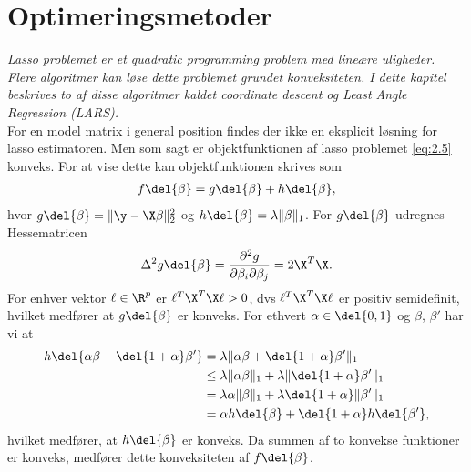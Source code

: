 \chapter{Optimeringsmetoder} \label{kap:optimeringsmetoder}
\textit{Lasso problemet er et quadratic programming problem med lineære uligheder. 
Flere algoritmer kan løse dette problemet grundet konveksiteten.  
I dette kapitel beskrives to af disse algoritmer kaldet coordinate descent og Least Angle Regression (LARS).} \\[4mm]
%
For en model matrix i general position findes der ikke en eksplicit løsning for lasso estimatoren.
Men som sagt er objektfunktionen af lasso problemet \eqref{eq:2.5} konveks.
For at vise dette kan objektfunktionen skrives som
\begin{align*}
f \del{\beta} = g \del{\beta} + h \del{\beta},
\end{align*}
hvor \(g \del{\beta} = \Vert \y - \X \beta \Vert_2^2\) og \(h \del{\beta} = \lambda \Vert \beta \Vert_1\).
For \(g \del{\beta}\) udregnes Hessematricen
\begin{align*}
\Delta^2 g \del{\beta} = \frac{\partial^2 g }{\partial \beta_i \partial \beta_j} = 2 \X^T \X.
\end{align*}
For enhver vektor \(\ell \in \R^p\) er \(\ell^T \X^T \X \ell > 0\), dvs \(\ell^T \X^T \X \ell \) er positiv semidefinit, hvilket medfører at \(g \del{\beta}\) er konveks.
For ethvert \(\alpha \in \del{0,1}\) og \(\beta\), \(\beta'\) har vi at
\begin{align*}
h \del{\alpha \beta + \del{1+\alpha}\beta'} &= \lambda \Vert \alpha \beta + \del{1+\alpha} \beta' \Vert_1 \\
&\leq \lambda \Vert \alpha \beta \Vert_1 + \lambda \Vert \del{1+\alpha} \beta' \Vert_1 \\
&= \lambda \alpha \Vert \beta \Vert_1 + \lambda \del{1+\alpha} \Vert \beta' \Vert_1 \\
&= \alpha h \del{\beta} + \del{1+\alpha} h \del{\beta'},
\end{align*}
hvilket medfører, at \(h \del{\beta}\) er konveks.
Da summen af to konvekse funktioner er konveks, medfører dette konveksiteten af \(f \del{\beta}\). 






